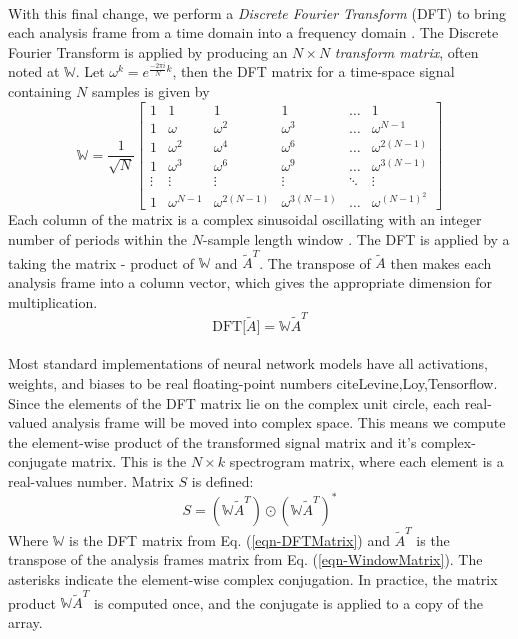 \documentclass[12pt,letterpaper]{article}
\begin{document}
\paragraph*{}With this final change, we perform a \textit{Discrete Fourier Transform} (DFT) to bring each analysis frame from a time domain into a frequency domain \cite{Olson,Peatross,Virtanen}. The Discrete Fourier Transform is applied by producing an $N \times N$ \textit{transform matrix}, often noted at $\mathbb{W}$. Let $\omega^k = e^{\frac{-2\pi i}{N}k}$, then the DFT matrix for a time-space signal containing $N$ samples is given by \cite{Taylor,Virtanen}
\begin{equation}
\label{eqn-DFTMatrix}
\mathbb{W} = \frac{1}{\sqrt{N}}
\begin{bmatrix}
1 & 1 & 1 & 1 & \hdots & 1 \\
1 & \omega		& \omega^2 & \omega^3 & \hdots & \omega^{N-1} \\
1 & \omega^2	& \omega^4 & \omega^6 & \hdots & \omega^{2(N-1)} \\
1 & \omega^3	& \omega^6 & \omega^9 & \hdots & \omega^{3(N-1)} \\
\vdots & \vdots & \vdots & \vdots & \ddots & \vdots \\
1 & \omega^{N-1} & \omega^{2(N-1)} & \omega^{3(N-1)} & \hdots & \omega^{(N-1)^2}
\end{bmatrix}
\end{equation}
Each column of the matrix is a complex sinusoidal oscillating with an integer number of periods within the $N$-sample length window \cite{Short,Peatross}. The DFT is applied by a taking the matrix - product of $\mathbb{W}$ and $\widetilde{A}^T$. The transpose of $\widetilde{A}$ then makes each analysis frame into a column vector, which gives the appropriate dimension for multiplication.
\begin{equation}
\label{eqn-DFT}
\text{DFT}\big[ \widetilde{A} \big] = \mathbb{W}\widetilde{A}^T
\end{equation}

\paragraph*{}Most standard implementations of neural network models have all activations, weights, and biases to be real floating-point numbers cite{Levine,Loy,Tensorflow}. Since the elements of the DFT matrix lie on the complex unit circle, each real-valued analysis frame will be moved into complex space. This means we compute the element-wise product of the transformed signal matrix and it's complex-conjugate matrix. This is the $N \times k$
spectrogram matrix, where each element is a real-values number. Matrix $S$ is defined:
\begin{equation}
\label{eqn-Spectrogram}
S = (\mathbb{W}\widetilde{A}^T) \odot (\mathbb{W}\widetilde{A}^T)^*
\end{equation}
Where $\mathbb{W}$ is the DFT matrix from Eq. (\ref{eqn-DFTMatrix}) and $\widetilde{A}^T$ is the transpose of the analysis frames matrix from Eq. (\ref{eqn-WindowMatrix}). The asterisks indicate the element-wise complex conjugation. In practice, the matrix product $\mathbb{W}\widetilde{A}^T$ is computed once, and the conjugate is applied to a copy of the array.
\end{document}
